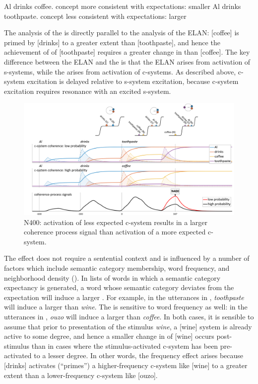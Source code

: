 \ea\label{ex:6:24}
\ea\label{ex:6:24a} Al drinks coffee. \break concept more consistent with expectations: smaller 
\ex\label{ex:6:24b} Al drinks toothpaste. \break concept less consistent with expectations: larger 
\z
\z

The analysis of the  is directly parallel to the analysis of the ELAN: [coffee] is primed by [drinks] to a greater extent than [toothpaste], and hence the achievement of  of [toothpaste] requires a greater change in  than [coffee]. The key difference between the ELAN and the  is that the ELAN arises from activation of s-sys\-tems, while the  arises from activation of c-sys\-tems. As described above, c-sys\-tem excitation is delayed relative to s-sys\-tem excitation, because c-sys\-tem excitation requires resonance with an excited s-sys\-tem.

  
\begin{figure}
\includegraphics[width=\textwidth]{figures/Tilsen-img143.png}
\caption{N400: activation of less expected c-sys\-tem results in a larger coherence process signal than activation of a more expected c-sys\-tem.}
\label{fig:6:24}
\end{figure}
 

The  effect does not require a sentential context and is influenced by a number of factors which include semantic category membership, word frequency, and neighborhood density (\citealt{KutasFedermeier2011,LauEtAl2008}). In lists of words in which a semantic category expectancy is generated, a word whose semantic category deviates from the expectation will induce a larger . For example, in the utterances in , \textit{toothpaste} will induce a larger  than \textit{wine}. The  is sensitive to word frequency as well: in the utterances in , \textit{ouzo} will induce a larger  than \textit{coffee}. In both cases, it is sensible to assume that prior to presentation of the stimulus \textit{wine}, a [wine] system is already active to some degree, and hence a smaller change in  of [wine] occurs post-stimulus than in cases where the stimulus-activated c-sys\-tem has been pre-activated to a lesser degree. In other words, the frequency effect arises because [drinks] activates (“primes”) a higher-frequency c-sys\-tem like [wine] to a greater extent than a lower-frequency c-sys\-tem like [ouzo].

